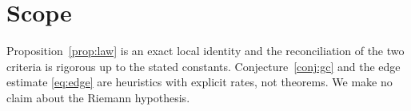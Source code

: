 \documentclass[11pt]{article}
\theoremstyle{plain}
\theoremstyle{definition}
\theoremstyle{remark}
\begin{document}
\section*{Scope}
Proposition~\ref{prop:law} is an exact local identity and the reconciliation of
the two criteria is rigorous up to the stated constants. Conjecture~\ref{conj:gc}
and the edge estimate \eqref{eq:edge} are heuristics with explicit rates, not
theorems. We make no claim about the Riemann hypothesis.
\end{document}
